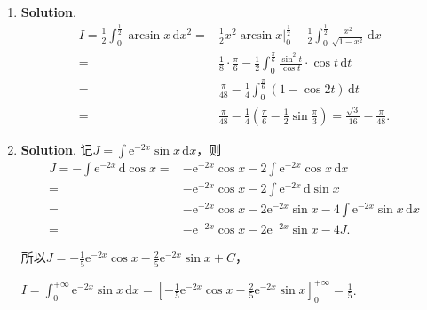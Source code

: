 \documentclass[../Main.tex]{subfiles}
\begin{document}
\begin{enumerate}
    \item \textbf{Solution}.
          \[
              \begin{aligned}
                  I = \frac{1}{2}\int_{0}^{\frac{1}{2}}\arcsin x\,\mathrm{d}x^{2} = & \frac{1}{2}x^{2}\arcsin x\bigg|_{0}^{\frac{1}{2}}-\frac{1}{2}\int_{0}^{\frac{1}{2}}\frac{x^2}{\sqrt{1-x^2}}\,\mathrm{d}x \\
                  =                                                                 & \frac{1}{8}\cdot\frac{\pi}{6}-\frac{1}{2}\int_{0}^{\frac{\pi}{6}}\frac{\sin^2 t}{\cos t}\cdot \cos t\,\mathrm{d}t        \\
                  =                                                                 & \frac{\pi}{48}-\frac{1}{4}\int_{0}^{\frac{\pi}{6}}(1-\cos 2t)\,\mathrm{d}t                                               \\
                  =                                                                 & \frac{\pi}{48}-\frac{1}{4}\left(\frac{\pi}{6}-\frac{1}{2}\sin\frac{\pi}{3}\right) = \frac{\sqrt{3}}{16}-\frac{\pi}{48}.
              \end{aligned}
          \]

    \item \textbf{Solution}. 记$J = \int \mathrm{e}^{-2x}\sin x\,\mathrm{d}x$，则
          \[
              \begin{aligned}
                  J = -\int \mathrm{e}^{-2x}\,\mathrm{d}\cos x = & -\mathrm{e}^{-2x}\cos x - 2\int \mathrm{e}^{-2x}\cos x\,\mathrm{d}x                           \\
                  =                                              & -\mathrm{e}^{-2x}\cos x - 2\int \mathrm{e}^{-2x}\,\mathrm{d}\sin x                            \\
                  =                                              & -\mathrm{e}^{-2x}\cos x - 2\mathrm{e}^{-2x}\sin x - 4\int \mathrm{e}^{-2x}\sin x\,\mathrm{d}x \\
                  =                                              & -\mathrm{e}^{-2x}\cos x - 2\mathrm{e}^{-2x}\sin x - 4J.
              \end{aligned}
          \]

          所以$J = -\frac{1}{5}\mathrm{e}^{-2x}\cos x - \frac{2}{5}\mathrm{e}^{-2x}\sin
              x + C$，

          $I=\int_{0}^{+\infty}\mathrm{e}^{-2x}\sin x\,\mathrm{d}x=\left[-\frac{1}{5}\mathrm{e}
                  ^{-2x}\cos x - \frac{2}{5}\mathrm{e}^{-2x}\sin x\right]_{0}^{+\infty}=\frac{1}{5}$.


\end{enumerate}
\end{document}
